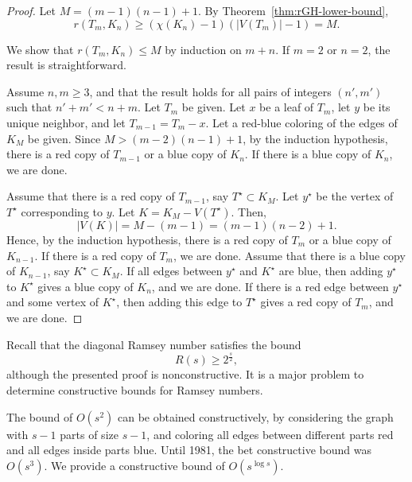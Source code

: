 \begin{proof}
    Let \(M = (m-1)(n-1) + 1\).
    By Theorem~\ref{thm:rGH-lower-bound},
    \begin{equation}
        r(T_m, K_n) \geq (\chi(K_n) - 1)(|V(T_m)| - 1) = M.
    \end{equation}

    We show that \(r(T_m, K_n) \leq M\) by induction on \(m + n\).
    If \(m = 2\) or \(n = 2\), the result is straightforward.

    Assume \(n, m \geq 3\),
    and that the result holds
    for all pairs of integers \((n', m')\)
    such that \(n' + m' < n + m\).
    Let \(T_m\) be given.
    Let \(x\) be a leaf of \(T_m\),
    let \(y\) be its unique neighbor,
    and let \(T_{m-1} = T_m - x\).
    Let a red-blue coloring of the edges of \(K_M\) be given.
    Since \(M > (m-2)(n-1) + 1\), by the induction hypothesis,
    there is a red copy of \(T_{m-1}\) or a blue copy of \(K_{n}\).
    If there is a blue copy of \(K_n\), we are done.

    Assume that there is a red copy of \(T_{m-1}\), say \(T^\star \subset K_M\).
    Let \(y^\star\) be the vertex of \(T^\star\) corresponding to \(y\).
    Let \(K = K_M - V(T^\star)\).
    Then,
    \begin{equation}
        |V(K)| = M - (m-1) = (m-1)(n-2) + 1.
    \end{equation}
    Hence, by the induction hypothesis, 
    there is a red copy of \(T_{m}\) or a blue copy of \(K_{n-1}\).
    If there is a red copy of \(T_m\), we are done.
    Assume that there is a blue copy of \(K_{n-1}\), say \(K^\star \subset K_M\).
    If all edges between \(y^\star\) and \(K^\star\) are blue, then adding \(y^\star\) to \(K^\star\) gives a blue copy of \(K_n\), and we are done.
    If there is a red edge between \(y^\star\) and some vertex of \(K^\star\), then adding this edge to \(T^\star\) gives a red copy of \(T_m\), and we are done.
\end{proof}

Recall that the diagonal Ramsey number satisfies the bound
\begin{equation}
    R(s) \geq 2^{\frac{s}{2}},
\end{equation}
although the presented proof is nonconstructive.
It is a major problem to determine constructive bounds for Ramsey numbers.

The bound of \(O(s^2)\) can be obtained constructively,
by considering the graph with \(s-1\) parts of size \(s-1\),
and coloring all edges between different parts red and all edges inside parts blue.
Until 1981, the bet constructive bound was \(O(s^3)\).
We provide a constructive bound of \(O(s^{\log s})\).

